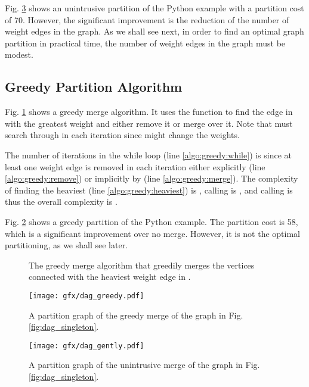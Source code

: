 Fig. \ref{fig:dag_gently} shows an unintrusive partition of the Python
example with a partition cost of 70. However, the significant
improvement is the reduction of the number of weight edges in the
graph. As we shall see next, in order to find an optimal graph
partition in practical time, the number of weight edges in the graph
must be modest.


\subsection{Greedy Partition Algorithm}

Fig. \ref{algo:greedy} shows a greedy merge algorithm. It uses the
function  to find the edge in  with the
greatest weight and either remove it or merge over it. Note that
 must search through  in each iteration
since  might change the weights.

The number of iterations in the while loop (line
\ref{algo:greedy:while}) is  since at least one weight edge is
removed in each iteration either explicitly (line
\ref{algo:greedy:remove}) or implicitly by  (line
\ref{algo:greedy:merge}). The complexity of finding the heaviest (line
\ref{algo:greedy:heaviest}) is , calling  is
, and calling  is  thus the overall
complexity is .

Fig. \ref{fig:dag_greedy} shows a greedy partition of the Python
example.  The partition cost is 58, which is a significant improvement
over no merge. However, it is not the optimal partitioning, as we
shall see later.

\ifdefined\LongVersion

\begin{figure}
\footnotesize
\begin{tcolorbox}
    \AlgoGreedy
\end{tcolorbox}
\caption{The greedy merge algorithm that greedily merges the vertices connected with the heaviest weight edge in .}
\label{algo:greedy}
\end{figure}

\begin{figure}
 \centering
 \texttt{[image: gfx/dag\_greedy.pdf]}
 \caption{A partition graph of the greedy merge of the graph in Fig. \ref{fig:dag_singleton}.}
\label{fig:dag_greedy}
\end{figure}

\begin{figure}
 \centering
 \texttt{[image: gfx/dag\_gently.pdf]}
 \caption{A partition graph of the unintrusive merge of the graph in Fig. \ref{fig:dag_singleton}.}
\label{fig:dag_gently}
\end{figure}

